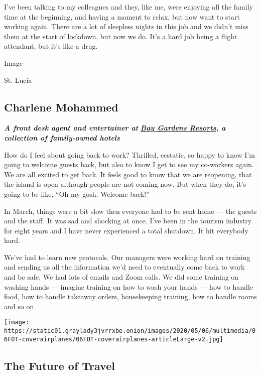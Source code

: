 I've been talking to my colleagues and they, like me, were enjoying all
the family time at the beginning, and having a moment to relax, but now
want to start working again. There are a lot of sleepless nights in this
job and we didn't miss them at the start of lockdown, but now we do.
It's a hard job being a flight attendant, but it's like a drug.

Image

St. Lucia

\hypertarget{charlene-mohammed}{%
\subsection{Charlene Mohammed}\label{charlene-mohammed}}

\emph{\textbf{A front desk agent and entertainer at}}
\textbf{\href{https://www.baygardensresorts.com/}{\emph{Bay Gardens
Resorts}}\emph{, a collection of family-owned hotels}}

How do I feel about going back to work? Thrilled, ecstatic, so happy to
know I'm going to welcome guests back, but also to know I get to see my
co-workers again. We are all excited to get back. It feels good to know
that we are reopening, that the island is open although people are not
coming now. But when they do, it's going to be like, ``Oh my gosh.
Welcome back!''

In March, things were a bit slow then everyone had to be sent home ---
the guests and the staff. It was sad and shocking at once. I've been in
the tourism industry for eight years and I have never experienced a
total shutdown. It hit everybody hard.

We've had to learn new protocols. Our managers were working hard on
training and sending us all the information we'd need to eventually come
back to work and be safe. We had lots of emails and Zoom calls. We did
some training on washing hands --- imagine training on how to wash your
hands --- how to handle food, how to handle takeaway orders,
housekeeping training, how to handle rooms and so on.

\href{https://www.nytimes3xbfgragh.onion/interactive/2020/05/06/travel/coronavirus-travel-questions.html}{}

\texttt{[image: https://static01.graylady3jvrrxbe.onion/images/2020/05/06/multimedia/06FOT-coverairplanes/06FOT-coverairplanes-articleLarge-v2.jpg]}

\hypertarget{the-future-of-travel}{%
\subsection{The Future of Travel}\label{the-future-of-travel}}

